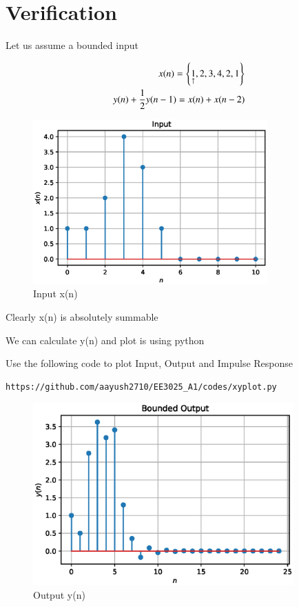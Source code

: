 \documentclass[journal,12pt,twocolumn]{IEEEtran}
\begin{document}
\section{Verification}

Let us assume a bounded input

\begin{align}
    x(n) = \left\{\underset{\uparrow}{1},2,3,4,2,1\right\}\\
    y(n)+\frac{1}{2}y(n-1) = x(n)+x(n-2)
\end{align}

\begin{figure}[h!]
    \centering
    \includegraphics[width=9cm]{./figs/fig_x.eps}
    \caption{Input x(n)}
    \label{x(n)}
\end{figure}

Clearly x(n) is absolutely summable

We can calculate y(n) and plot is using python

Use the following code to plot Input, Output and Impulse Response
\\
\begin{lstlisting}
https://github.com/aayush2710/EE3025_A1/codes/xyplot.py
\end{lstlisting}

\begin{figure}[h!]
    \centering
    \includegraphics[width=10cm]{./figs/fig_y.eps}
    \caption{Output y(n)}
    \label{y(n)}
\end{figure}
\end{document}
